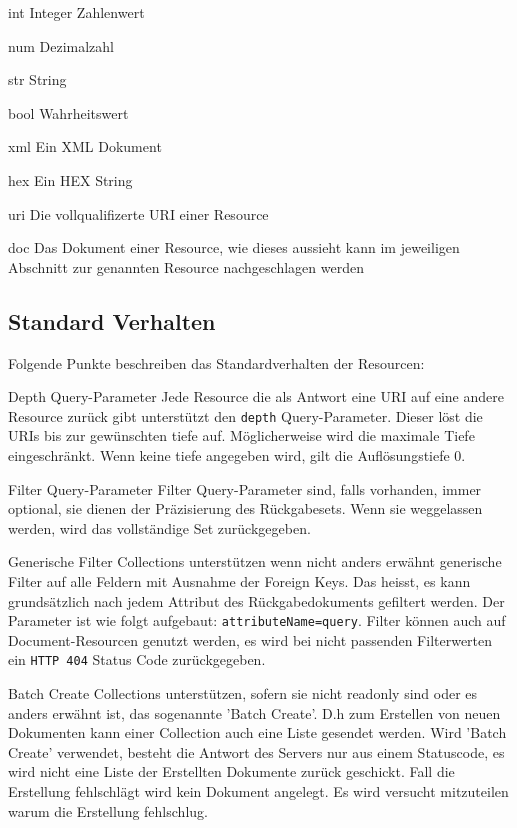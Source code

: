 \documentclass[10pt,a4paper]{scrartcl}
\begin{document}
\begin{description*}
	\item[int] Integer Zahlenwert
	\item[num] Dezimalzahl
	\item[str] String
	\item[bool] Wahrheitswert
	\item[xml] Ein XML Dokument
	\item[hex] Ein HEX String
	\item[uri] Die vollqualifizerte URI einer Resource
	\item[doc] Das Dokument einer Resource, wie dieses aussieht kann im jeweiligen
	Abschnitt zur genannten Resource nachgeschlagen werden
\end{description*}

\subsection{Standard Verhalten}
Folgende Punkte beschreiben das Standardverhalten der Resourcen:

\begin{description*}
	\item[Depth Query-Parameter] Jede Resource die als Antwort eine URI auf eine
	andere Resource zurück gibt unterstützt den \texttt{depth} Query-Parameter.
	Dieser löst die URIs bis zur gewünschten tiefe auf. Möglicherweise wird die
	maximale Tiefe eingeschränkt. Wenn keine tiefe angegeben wird, gilt die
	Auflösungstiefe 0.
	
	\item[Filter Query-Parameter] Filter Query-Parameter sind, falls vorhanden,
	immer optional, sie dienen der Präzisierung des Rückgabesets. Wenn sie
	weggelassen werden, wird das vollständige Set zurückgegeben.
	
	\item[Generische Filter] Collections unterstützen wenn nicht anders erwähnt
	generische Filter auf alle Feldern mit Ausnahme der Foreign Keys. Das heisst,
	es kann grundsätzlich nach jedem Attribut des Rückgabedokuments gefiltert
	werden. Der Parameter ist wie folgt aufgebaut: \texttt{attributeName=query}.
	Filter können auch auf Document-Resourcen genutzt werden, es wird bei nicht
	passenden Filterwerten ein \texttt{HTTP 404} Status Code zurückgegeben.
	
	\item[Batch Create] Collections unterstützen, sofern sie nicht readonly sind
	oder es anders erwähnt ist, das sogenannte 'Batch Create'. D.h zum Erstellen
	von neuen Dokumenten kann einer Collection auch eine Liste gesendet werden.
	Wird 'Batch Create' verwendet, besteht die Antwort des Servers nur aus einem
	Statuscode, es wird nicht eine Liste der Erstellten Dokumente zurück geschickt.
	Fall die Erstellung fehlschlägt wird kein Dokument angelegt. Es wird versucht
	mitzuteilen warum die Erstellung fehlschlug.

\end{description*}
 
\end{document}
